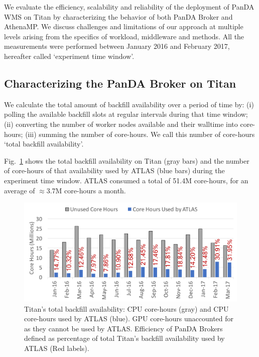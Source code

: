 
We evaluate the efficiency, scalability and reliability of the deployment of
PanDA WMS on Titan by characterizing the behavior of both PanDA Broker and
AthenaMP\@. We discuss challenges and limitations of our approach at multiple
levels arising from the specifics of workload, middleware and methods. All
the measurements were performed between January 2016 and February 2017,
hereafter called `experiment time window'.

\subsection{Characterizing the PanDA Broker on Titan}
\label{ssec:broker_titan}

We calculate the total amount of backfill availability over a period of time
by: (i) polling the available backfill slots at regular intervals during that
time window; (ii) converting the number of worker nodes available and their
walltime into core-hours; (iii) summing the number of core-hours. We call
this number of core-hours `total backfill availability'.

Fig.~\ref{fig:backfill-utilization} shows the total backfill availability on
Titan (gray bars) and the number of core-hours of that availability used by
ATLAS (blue bars) during the experiment time window. ATLAS consumed a total
of 51.4M core-hours, for an average of $\approx$3.7M core-hours a month. 

\begin{figure}[!t]
    \includegraphics[clip,width=\columnwidth]{figures/backfill_consumption.pdf}
    \vspace{-0.3in}
    \caption{Titan's total backfill availability: CPU core-hours (gray) and
    CPU core-hours used by ATLAS (blue). GPU core-hours unaccounted for as
    they cannot be used by ATLAS\@. Efficiency of PanDA Brokers defined as
    percentage of total Titan's backfill availability used by ATLAS (Red
    labels).}
\label{fig:backfill-utilization}
\end{figure}

